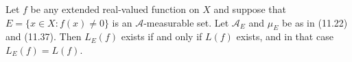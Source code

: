 Let $f$ be any extended real-valued function on $X$ and suppose that $E = \{x \in X : f(x) \neq 0\}$ is an $\mathcal{A}$-measurable set. Let $\mathcal{A}_E$ and $\mu_E$ be as in (11.22) and (11.37). Then $L_E(f)$ exists if and only if $L(f)$ exists, and in that case $L_E(f) = L(f)$.
